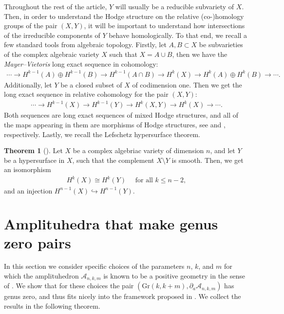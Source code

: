 \documentclass[12pt]{extarticle}
\theoremstyle{definition}
\theoremstyle{theorem}
\newtheorem{theorem}[definition]{Theorem}
\theoremstyle{remark}
\numberwithin{equation}{section}
\newcommand{\aA}{\mathcal{A}}
\begin{document}
Throughout the rest of the article, $Y$ will usually be a reducible subvariety of $X$.
Then, in order to understand the Hodge structure on the relative (co-)homology groups of the pair $(X,Y)$, it will be important to understand how intersections of the irreducible components of $Y$ behave homologically.
To that end, we recall a few standard tools from algebraic topology.
Firstly, let $A,B\subset X$ be subvarieties of the complex algebraic variety $X$ such that $X=A\cup B$, then we have the \emph{Mayer--Vietoris} long exact sequence in cohomology:
\begin{align}\label{eq:MV}
    \cdots \to H^{k-1}(A) \oplus H^{k-1}(B)\to H^{k-1}(A\cap B) \to H^k(X) \to H^k(A) \oplus H^k(B) \to \cdots.
\end{align}
Additionally, let $Y$ be a closed subset of $X$ of codimension one. Then we get the long exact sequence in relative cohomology for the pair $(X,Y)$:
\begin{align}\label{eq:relLES}
    \cdots \to H^{k-1}(X) \to H^{k-1}(Y) \to H^k(X,Y) \to H^k(X) \to \cdots.
\end{align}
Both sequences are long exact sequences of mixed Hodge structures, and all of the maps appearing in them are morphisms of Hodge structures, see \cite[Appendix C.23/30]{Dimca_sing_hypersurfaces} and \cite[Proposition 5.46]{MHS}, respectively.
Lastly, we recall the Lefschetz hypersurface theorem. 
\begin{theorem}[{\cite[Theorem 1.23]{Voisin_2003}}]\label{thm:Lefschetz_Voisin}
    Let $X$ be a complex algebriac variety of dimension $n$, and let $Y$ be a hypersurface in $X$, such that the complement $X\setminus Y$ is smooth. Then, we get an isomorphism
    \begin{align}\label{eq:Lefschetz}
        H^k(X)\cong H^{k}(Y)\quad \text{ for all } k\leq n-2,
    \end{align}
    and an injection $H^{n-1}(X)\hookrightarrow H^{n-1}(Y)$.
\end{theorem}

\section{Amplituhedra that make genus zero pairs}\label{sec:vanishing_genus}

In this section we consider specific choices of the parameters $n$, $k$, and $m$ for which the amplituhedron $\aA_{n,k,m}$ is known to be a positive geometry in the sense of \cite{pos_geom_2017}. We show that for these choices the pair $(\mathrm{Gr}(k,k+m),\partial_a \aA_{n,k,m})$ has genus zero, and thus fits nicely into the framework proposed in \cite{brown-dupont}.
We collect the results in the following theorem. 
\end{document}
